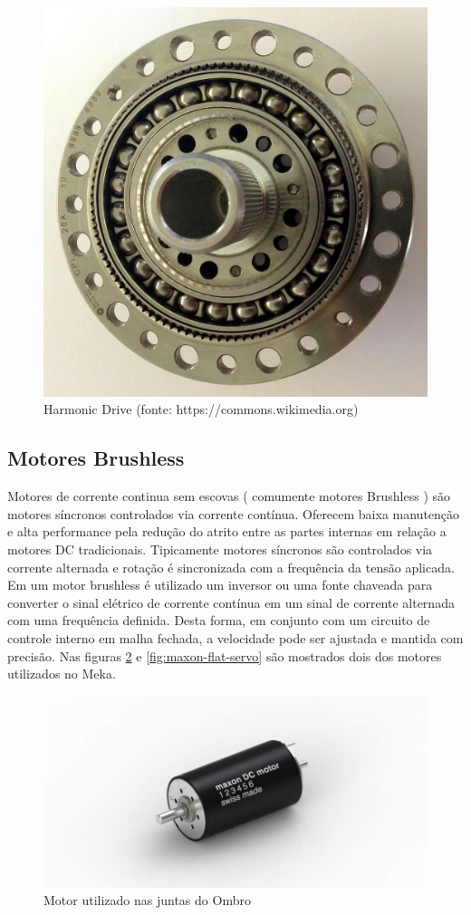 \begin{figure}[H]
    \centering
    \includegraphics[width=0.4\linewidth]{tex/figs/harmonic_drive.jpg}
    \caption{Harmonic Drive (fonte: https://commons.wikimedia.org)}
    \label{fig:harmonic_drive}
\end{figure}




\subsection{Motores Brushless}
Motores de corrente continua sem escovas ( comumente motores Brushless ) são motores síncronos controlados via corrente contínua. Oferecem baixa manutenção e alta performance pela redução do atrito entre as partes internas em relação a motores DC tradicionais. Tipicamente motores síncronos são controlados via corrente alternada e rotação é sincronizada com a frequência da tensão aplicada. Em um motor brushless é utilizado um inversor ou uma fonte chaveada para converter o sinal elétrico de corrente contínua em um sinal de corrente alternada com uma frequência definida. Desta forma, em conjunto com um circuito de controle interno em malha fechada, a velocidade pode ser ajustada e mantida com precisão. \cite{nobody} Nas figuras \ref{fig:maxon-servo} e \ref{fig:maxon-flat-servo} são mostrados dois dos motores utilizados no Meka.

\begin{figure}[H]
    \centering
    \includegraphics[width = 0.6\linewidth]{figs/maxon_servo.jpg}
    \caption{Motor utilizado nas juntas do Ombro}
    \label{fig:maxon-servo}
\end{figure}

